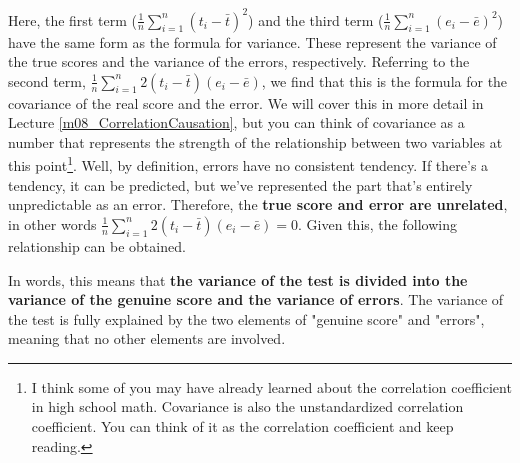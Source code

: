\documentclass{ltjbook}
\begin{document}

Here, the first term ($\frac{1}{n}\sum_{i=1}^n (t_i - \bar{t})^2$) and the third term ($\frac{1}{n}\sum_{i=1}^n (e_i - \bar{e})^2$) have the same form as the formula for variance. These represent the variance of the true scores and the variance of the errors, respectively.
Referring to the second term, $\frac{1}{n}\sum_{i=1}^n 2(t_i - \bar{t})(e_i - \bar{e})$, we find that this is the formula for the covariance of the real score and the error. We will cover this in more detail in Lecture \ref{m08_CorrelationCausation}, but you can think of covariance as a number that represents the strength of the relationship between two variables at this point\footnote{I think some of you may have already learned about the correlation coefficient in high school math. Covariance is also the unstandardized correlation coefficient. You can think of it as the correlation coefficient and keep reading.}.
Well, by definition, errors have no consistent tendency. If there's a tendency, it can be predicted, but we've represented the part that's entirely unpredictable as an error. Therefore, the \textbf{true score and error are unrelated}, in other words $\frac{1}{n}\sum_{i=1}^n 2(t_i - \bar{t})(e_i - \bar{e})=0$.
Given this, the following relationship can be obtained.

In words, this means that \textbf{the variance of the test is divided into the variance of the genuine score and the variance of errors}. The variance of the test is fully explained by the two elements of "genuine score" and "errors", meaning that no other elements are involved.
\end{document}

